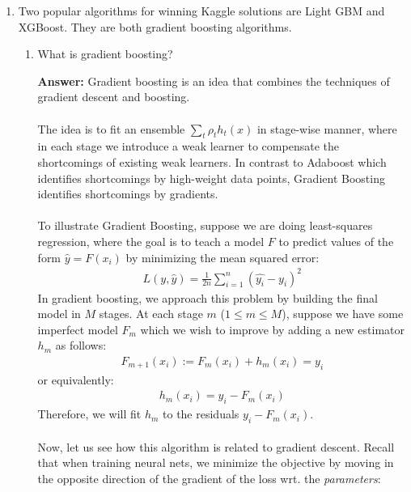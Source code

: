 \documentclass{article}
\newenvironment{QandA}{\begin{enumerate}[label=\arabic*.]}{\end{enumerate}}
\newenvironment{InnerQandA}{\begin{enumerate}[label=\roman*.]}{\end{enumerate}}
\newenvironment{answer}{\par\normalfont \textbf{Answer:}}{}
\begin{document}
\begin{QandA}
\begin{InnerQandA}
\begin{answer}
        (See more \href{https://www.youtube.com/watch?v=O2L2Uv9pdDA&ab_channel=StatQuestwithJoshStarmer}{here})
        \end{answer}
    \end{InnerQandA}

    \item Two popular algorithms for winning Kaggle solutions are Light GBM and XGBoost. They are both gradient boosting algorithms.
    \begin{InnerQandA}
        \item What is gradient boosting?
        \begin{answer}
            Gradient boosting is an idea that combines the techniques of gradient descent and boosting. \\\\
            The idea is to fit an ensemble $\sum_t \rho_t h_t(x)$ in stage-wise manner, where in each stage we introduce a weak learner to compensate the shortcomings of existing weak learners. In contrast to Adaboost which identifies shortcomings by high-weight data points, Gradient Boosting identifies shortcomings by gradients.\\\\
            To illustrate Gradient Boosting, suppose we are doing least-squares regression, where the goal is to teach a model $F$ to predict values of the form $\hat{y} = F(x_i)$ by minimizing the mean squared error:
            \begin{align*}
                L(y, \hat{y}) = \frac{1}{2n}\sum_{i=1}^n (\hat{y_i} - y_i)^2
            \end{align*}
            In gradient boosting, we approach this problem by building the final model in $M$ stages. At each stage $m$ ($1 \le m \le M$), suppose we have some imperfect model $F_m$ which we wish to improve by adding a new estimator $h_m$ as follows:
            \begin{align*}
                F_{m+1}(x_i) := F_m(x_i) + h_m(x_i) = y_i 
            \end{align*}
            or equivalently:
            \begin{align*}
                h_m(x_i) = y_i - F_m(x_i)
            \end{align*}
            Therefore, we will fit $h_m$ to the residuals $y_i - F_m(x_i)$. \\\\
            Now, let us see how this algorithm is related to gradient descent. Recall that when training neural nets, we minimize the objective by moving in the opposite direction of the gradient of the loss wrt. the \textit{parameters}:

\end{answer}
\end{InnerQandA}
\end{QandA}
\end{document}
